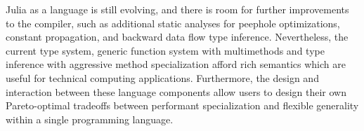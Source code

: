 \documentclass[10pt, preprint]{sigplanconf}
\begin{document}
Julia as a language is still evolving, and there is room for further
improvements to the compiler, such as additional static analyses for peephole
optimizations, constant propagation, and backward data flow type inference.
Nevertheless, the current type system, generic function system with
multimethods and type inference with aggressive method specialization afford
rich semantics which are useful for technical computing applications.
Furthermore, the design and interaction between these language components allow
users to design their own Pareto-optimal tradeoffs between performant
specialization and flexible generality within a single programming language.






\end{document}
